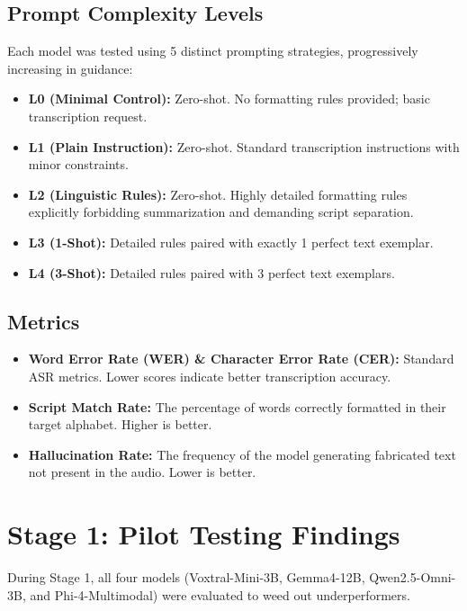 \documentclass[12pt]{article}
\begin{document}
\subsection{Prompt Complexity Levels}
Each model was tested using 5 distinct prompting strategies, progressively increasing in guidance:
\begin{itemize}
    \item \textbf{L0 (Minimal Control):} Zero-shot. No formatting rules provided; basic transcription request.
    \item \textbf{L1 (Plain Instruction):} Zero-shot. Standard transcription instructions with minor constraints.
    \item \textbf{L2 (Linguistic Rules):} Zero-shot. Highly detailed formatting rules explicitly forbidding summarization and demanding script separation.
    \item \textbf{L3 (1-Shot):} Detailed rules paired with exactly 1 perfect text exemplar.
    \item \textbf{L4 (3-Shot):} Detailed rules paired with 3 perfect text exemplars.
\end{itemize}

\subsection{Metrics}
\begin{itemize}
    \item \textbf{Word Error Rate (WER) \& Character Error Rate (CER):} Standard ASR metrics. Lower scores indicate better transcription accuracy.
    \item \textbf{Script Match Rate:} The percentage of words correctly formatted in their target alphabet. Higher is better.
    \item \textbf{Hallucination Rate:} The frequency of the model generating fabricated text not present in the audio. Lower is better.
\end{itemize}

\newpage
\section{Stage 1: Pilot Testing Findings}
During Stage 1, all four models (Voxtral-Mini-3B, Gemma4-12B, Qwen2.5-Omni-3B, and Phi-4-Multimodal) were evaluated to weed out underperformers.
\end{document}
